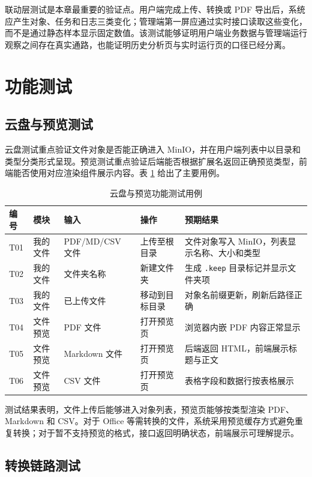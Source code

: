 联动层测试是本章最重要的验证点。用户端完成上传、转换或 PDF 导出后，系统应产生对象、任务和日志三类变化；管理端第一屏应通过实时接口读取这些变化，而不是通过静态样本显示固定数值。该测试能够证明用户端业务数据与管理端运行观察之间存在真实通路，也能证明历史分析页与实时运行页的口径已经分离。

\section{功能测试}

\subsection{云盘与预览测试}

云盘测试重点验证文件对象是否能正确进入 MinIO，并在用户端列表中以目录和类型分类形式呈现。预览测试重点验证后端能否根据扩展名返回正确预览类型，前端能否使用对应渲染组件展示内容。表 \ref{tab:chap06-file-preview-tests} 给出了主要用例。

\begin{table}[H]
  \centering
  \caption{云盘与预览功能测试用例}
  \label{tab:chap06-file-preview-tests}
  \begin{tabularx}{\textwidth}{lXXXX}
    \toprule
    编号 & 模块 & 输入 & 操作 & 预期结果 \\
    \midrule
    T01 & 我的文件 & PDF/MD/CSV 文件 & 上传至根目录 & 文件对象写入 MinIO，列表显示名称、大小和类型 \\
    T02 & 我的文件 & 文件夹名称 & 新建文件夹 & 生成 \texttt{.keep} 目录标记并显示文件夹项 \\
    T03 & 我的文件 & 已上传文件 & 移动到目标目录 & 对象名前缀更新，刷新后路径正确 \\
    T04 & 文件预览 & PDF 文件 & 打开预览页 & 浏览器内嵌 PDF 内容正常显示 \\
    T05 & 文件预览 & Markdown 文件 & 打开预览页 & 后端返回 HTML，前端展示标题与正文 \\
    T06 & 文件预览 & CSV 文件 & 打开预览页 & 表格字段和数据行按表格展示 \\
    \bottomrule
  \end{tabularx}
\end{table}

测试结果表明，文件上传后能够进入对象列表，预览页能够按类型渲染 PDF、Markdown 和 CSV。对于 Office 等需转换的文件，系统采用预览缓存方式避免重复转换；对于暂不支持预览的格式，接口返回明确状态，前端展示可理解提示。

\subsection{转换链路测试}

